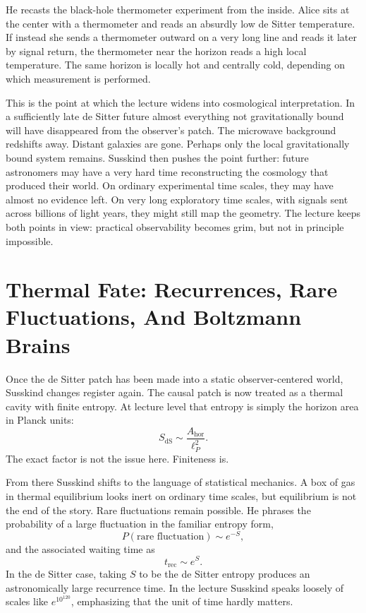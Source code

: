 He recasts the black-hole thermometer experiment from the inside. Alice sits at the center with a thermometer and reads an absurdly low de Sitter temperature. If instead she sends a thermometer outward on a very long line and reads it later by signal return, the thermometer near the horizon reads a high local temperature. The same horizon is locally hot and centrally cold, depending on which measurement is performed.

This is the point at which the lecture widens into cosmological interpretation. In a sufficiently late de Sitter future almost everything not gravitationally bound will have disappeared from the observer's patch. The microwave background redshifts away. Distant galaxies are gone. Perhaps only the local gravitationally bound system remains. Susskind then pushes the point further: future astronomers may have a very hard time reconstructing the cosmology that produced their world. On ordinary experimental time scales, they may have almost no evidence left. On very long exploratory time scales, with signals sent across billions of light years, they might still map the geometry. The lecture keeps both points in view: practical observability becomes grim, but not in principle impossible.

\section{Thermal Fate: Recurrences, Rare Fluctuations, And Boltzmann Brains}

Once the de Sitter patch has been made into a static observer-centered world, Susskind changes register again. The causal patch is now treated as a thermal cavity with finite entropy. At lecture level that entropy is simply the horizon area in Planck units:
\begin{equation}
S_{\text{dS}}\sim \frac{A_{\text{hor}}}{\ell_P^2}.
\end{equation}
The exact factor is not the issue here. Finiteness is.

From there Susskind shifts to the language of statistical mechanics. A box of gas in thermal equilibrium looks inert on ordinary time scales, but equilibrium is not the end of the story. Rare fluctuations remain possible. He phrases the probability of a large fluctuation in the familiar entropy form,
\begin{equation}
P(\text{rare fluctuation})\sim e^{-S},
\end{equation}
and the associated waiting time as
\begin{equation}
t_{\text{rec}}\sim e^{S}.
\end{equation}
In the de Sitter case, taking \(S\) to be the de Sitter entropy produces an astronomically large recurrence time. In the lecture Susskind speaks loosely of scales like \(e^{10^{120}}\), emphasizing that the unit of time hardly matters.

